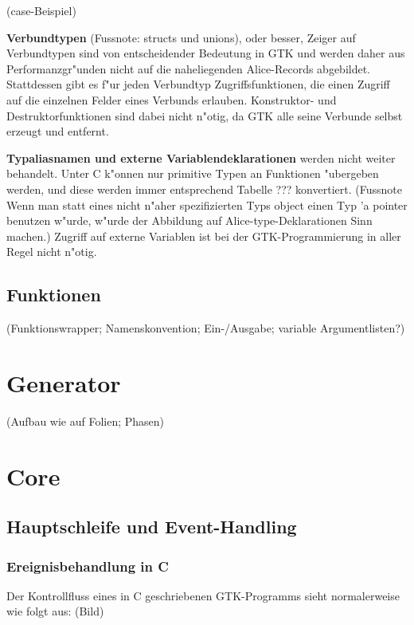 \documentclass{article}
\begin{document}
(case-Beispiel)

\textbf{Verbundtypen} (Fussnote: structs und unions), oder besser,
Zeiger auf Verbundtypen sind von entscheidender
Bedeutung in GTK und werden daher aus Performanzgr"unden nicht auf die
naheliegenden Alice-Records abgebildet.
Stattdessen gibt es f"ur jeden Verbundtyp Zugriffsfunktionen,
die einen Zugriff auf die einzelnen Felder eines Verbunds erlauben.
Konstruktor- und Destruktorfunktionen sind dabei nicht n"otig, da GTK alle
seine Verbunde selbst erzeugt und entfernt.

\textbf{Typaliasnamen und externe Variablendeklarationen} werden nicht weiter
behandelt. Unter C k"onnen nur primitive Typen an Funktionen "ubergeben werden,
und diese werden immer entsprechend Tabelle ??? konvertiert. 
(Fussnote Wenn man statt eines nicht n"aher spezifizierten Typs object 
einen Typ 'a pointer benutzen w"urde, w"urde der Abbildung auf 
Alice-type-Deklarationen Sinn machen.)
Zugriff auf externe Variablen ist bei der GTK-Programmierung in aller Regel
nicht n"otig.

\subsection{Funktionen}

(Funktionswrapper; Namenskonvention; Ein-/Ausgabe; variable Argumentlisten?)

\section{Generator}

(Aufbau wie auf Folien; Phasen)

\section{Core}

\subsection{Hauptschleife und Event-Handling}

\subsubsection{Ereignisbehandlung in C}

Der Kontrollfluss eines in C geschriebenen GTK-Programms sieht normalerweise
wie folgt aus: (Bild)
\end{document}
